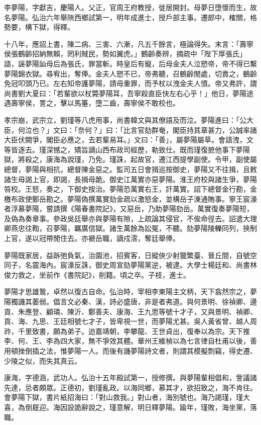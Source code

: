 \begin{pinyinscope}
李夢陽，字獻吉，慶陽人。父正，官周王府教授，徙居開封。母夢日墮懷而生，故名夢陽。弘治六年舉陜西鄉試第一，明年成進士，授戶部主事。遷郎中，榷關，格勢要，構下獄，得釋。

十八年，應詔上書，陳二病、三害、六漸，凡五千餘言，極論得失。末言：「壽寧侯張鶴齡招納無賴，罔利賊民，勢如翼虎。」鶴齡奏辨，摘疏中「陛下厚張氏」語，誣夢陽訕母后為張氏，罪當斬。時皇后有寵，后母金夫人泣愬帝，帝不得已繫夢陽錦衣獄。尋宥出，奪俸。金夫人愬不已，帝弗聽，召鶴齡閒處，切責之，鶴齡免冠叩頭乃已。左右知帝護夢陽，請毋重罪，而予杖以洩金夫人憤。帝又弗許，謂尚書劉大夏曰：「若輩欲以杖斃夢陽耳，吾寧殺直臣快左右心乎！」他日，夢陽途遇壽寧侯，詈之，擊以馬箠，墮二齒，壽寧侯不敢校也。

孝宗崩，武宗立，劉瑾等八虎用事，尚書韓文與其僚語及而泣。夢陽進曰：「公大臣，何泣也？」文曰：「奈何？」曰：「比言官劾群奄，閣臣持其章甚力，公誠率諸大臣伏闕爭，閣臣必應之，去若輩易耳。」文曰：「善」，屬夢陽屬草。會語洩，文等皆逐去。瑾深憾之，矯旨謫山西布政司經歷，勒致仕。既而瑾復摭他事下夢陽獄，將殺之，康海為說瑾，乃免。瑾誅，起故官，遷江西提學副使。令甲，副使屬總督，夢陽與相抗，總督陳金惡之。監司五日會揖巡按御史，夢陽又不往揖，且敕諸生毋謁上官，即謁，長揖毋跪。御史江萬實亦惡夢陽。淮王府校與諸生爭，夢陽笞校。王怒，奏之，下御史按治。夢陽恐萬實右王，訐萬實。詔下總督金行勘，金檄布政使鄭岳勘之。夢陽偽撰萬實劾金疏以激怒金，並構岳子涷通賄事。寧王宸濠者浮慕夢陽，嘗請撰《陽春書院記》，又惡岳，乃助夢陽劾岳。萬實復奏夢陽短，及偽為奏章事。參政吳廷舉亦與夢陽有隙，上疏論其侵官，不俟命徑去。詔遣大理卿燕忠往鞫，召夢陽，羈廣信獄。諸生萬餘為訟冤，不聽。劾夢陽陵轢同列，挾制上官，遂以冠帶閒住去。亦褫岳職，謫戍澐，奪廷舉俸。

夢陽既家居，益跅弛負氣，治園池，招賓客，日縱俠少射獵繁臺、晉丘間，自號空同子，名震海內。宸濠反誅，御史周宣劾夢陽黨逆，被逮。大學士楊廷和、尚書林俊力救之，坐前作《書院記》，削籍。頃之卒。子枝，進士。

夢陽才思雄鷙，卓然以復古自命。弘治時，宰相李東陽主文柄，天下翕然宗之，夢陽獨譏其萎弱。倡言文必秦、漢，詩必盛唐，非是者弗道。與何景明、徐禎卿、邊貢、朱應登、顧璘、陳沂、鄭善夫、康海、王九思等號十才子，又與景明、禎卿、貢、海、九思、王廷相號七才子，皆卑視一世，而夢陽尤甚。吳人黃省曾、越人周祚，千里致書，願為弟子。迨嘉靖朝，李攀龍、王世貞出，復奉以為宗。天下推李、何、王、李為四大家，無不爭效其體。華州王維楨以為七言律自杜甫以後，善用頓挫倒插之法，惟夢陽一人。而後有譏夢陽詩文者，則謂其模擬剽竊，得史遷、少陵之似，而失其真云。

康海，字德涵，武功人。弘治十五年殿試第一，授修撰。與夢陽輩相倡和，訾議諸先達，忌者頗眾。正德初，劉瑾亂政。以海同鄉，慕其才，欲招致之，海不肯往。會夢陽下獄，書片紙招海曰：「對山救我。」對山者，海別號也。海乃謁瑾，瑾大喜，為倒屣迎。海因設詭辭說之，瑾意解，明日釋夢陽。踰年，瑾敗，海坐黨，落職。


\end{pinyinscope}
